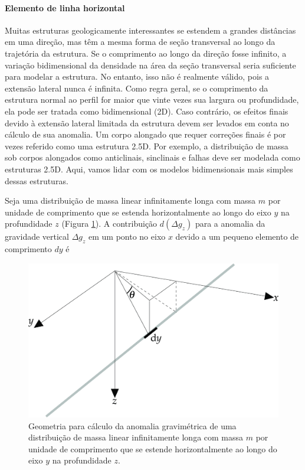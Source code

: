 \documentclass[]{book}
\let\oldparagraph\paragraph
\renewcommand{\paragraph}[1]{\oldparagraph{#1}\mbox{}}
\theoremstyle{definition}
\theoremstyle{definition}
\theoremstyle{definition}
\theoremstyle{remark}
\begin{document}
\hypertarget{elemento-de-linha-horizontal}{%
\paragraph{Elemento de linha horizontal}\label{elemento-de-linha-horizontal}}

Muitas estruturas geologicamente interessantes se estendem a grandes distâncias em uma direção, mas têm a mesma forma de seção transversal ao longo da trajetória da estrutura. Se o comprimento ao longo da direção fosse infinito, a variação bidimensional da densidade na área da seção transversal seria suficiente para modelar a estrutura. No entanto, isso não é realmente válido, pois a extensão lateral nunca é infinita. Como regra geral, se o comprimento da estrutura normal ao perfil for maior que vinte vezes sua largura ou profundidade, ela pode ser tratada como bidimensional (2D). Caso contrário, os efeitos finais devido à extensão lateral limitada da estrutura devem ser levados em conta no cálculo de sua anomalia. Um corpo alongado que requer correções finais é por vezes referido como uma estrutura 2.5D. Por exemplo, a distribuição de massa sob corpos alongados como anticlinais, sinclinais e falhas deve ser modelada como estruturas 2.5D. Aqui, vamos lidar com os modelos bidimensionais mais simples dessas estruturas.

Seja uma distribuição de massa linear infinitamente longa com massa \(m\) por unidade de comprimento que se estenda horizontalmente ao longo do eixo \(y\) na profundidade \(z\) (Figura \ref{fig:linha}). A contribuição \(d(\Delta g_z)\) para a anomalia da gravidade vertical \(\Delta g_z\) em um ponto no eixo \(x\) devido a um pequeno elemento de comprimento \(dy\) é

\begin{figure}

{\centering \includegraphics[width=0.6\linewidth]{fig/Fig_02.43} 

}

\caption{Geometria para cálculo da anomalia gravimétrica de uma distribuição de massa linear infinitamente longa com massa $m$ por unidade de comprimento que se estende horizontalmente ao longo do eixo $y$ na profundidade $z$.}\label{fig:linha}
\end{figure}
\end{document}
